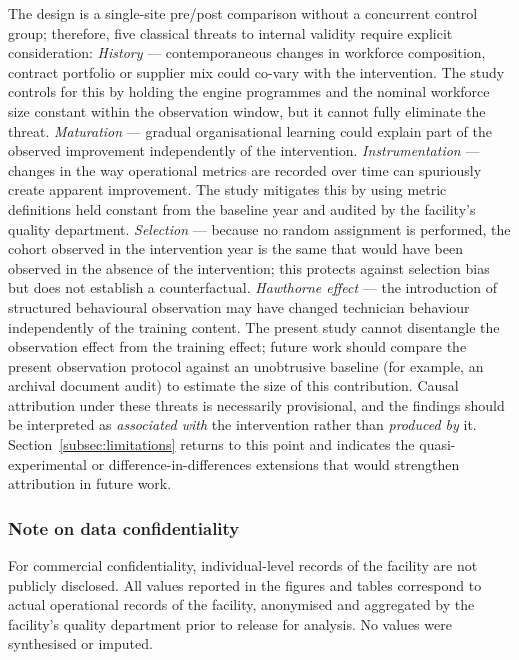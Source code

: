 The design is a single-site pre/post comparison without a concurrent control
group; therefore, five classical threats to internal validity require
explicit consideration:
\textit{History} --- contemporaneous changes in workforce composition,
contract portfolio or supplier mix could co-vary with the intervention.
The study controls for this by holding the engine programmes and the
nominal workforce size constant within the observation window, but it
cannot fully eliminate the threat.
\textit{Maturation} --- gradual organisational learning could explain part
of the observed improvement independently of the intervention.
\textit{Instrumentation} --- changes in the way operational metrics are
recorded over time can spuriously create apparent improvement. The study
mitigates this by using metric definitions held constant from the baseline
year and audited by the facility's quality department.
\textit{Selection} --- because no random assignment is performed, the
cohort observed in the intervention year is the same that would have been
observed in the absence of the intervention; this protects against
selection bias but does not establish a counterfactual.
\textit{Hawthorne effect} --- the introduction of structured behavioural
observation may have changed technician behaviour independently of the
training content. The present study cannot disentangle the observation
effect from the training effect; future work should compare the present
observation protocol against an unobtrusive baseline (for example, an
archival document audit) to estimate the size of this contribution.
Causal attribution under these threats is necessarily provisional, and the
findings should be interpreted as \emph{associated with} the intervention
rather than \emph{produced by} it. Section~\ref{subsec:limitations} returns
to this point and indicates the quasi-experimental or
difference-in-differences extensions that would strengthen attribution in
future work.

\subsubsection*{Note on data confidentiality}

For commercial confidentiality, individual-level records of the facility
are not publicly disclosed. All values reported in the figures and tables
correspond to actual operational records of the facility, anonymised and
aggregated by the facility's quality department prior to release for
analysis. No values were synthesised or imputed.
